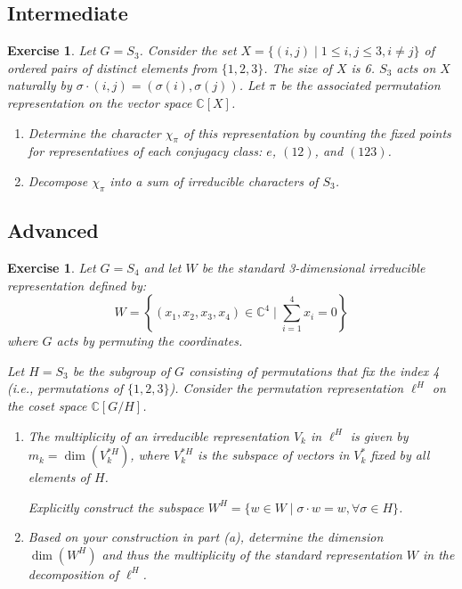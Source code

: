 \documentclass{article}
\newtheorem{exercise}[theorem]{Exercise}
\begin{document}
\subsection*{Intermediate}

\begin{exercise}
Let $G = S_3$. Consider the set $X = \{(i, j) \mid 1 \le i, j \le 3, i \neq j\}$ of ordered pairs of distinct elements from $\{1, 2, 3\}$. The size of $X$ is 6. $S_3$ acts on $X$ naturally by $\sigma \cdot (i, j) = (\sigma(i), \sigma(j))$.
Let $\pi$ be the associated permutation representation on the vector space $\mathbb{C}[X]$.

\begin{enumerate}
    \item[(a)] Determine the character $\chi_\pi$ of this representation by counting the fixed points for representatives of each conjugacy class: $e$, $(12)$, and $(123)$.
    \item[(b)] Decompose $\chi_\pi$ into a sum of irreducible characters of $S_3$.
\end{enumerate}
\end{exercise}

\subsection*{Advanced}

\begin{exercise}
Let $G = S_4$ and let $W$ be the standard 3-dimensional irreducible representation defined by:
\[ W = \left\{ (x_1, x_2, x_3, x_4) \in \mathbb{C}^4 \mid \sum_{i=1}^4 x_i = 0 \right\} \]
where $G$ acts by permuting the coordinates.

Let $H = S_3$ be the subgroup of $G$ consisting of permutations that fix the index 4 (i.e., permutations of $\{1, 2, 3\}$). Consider the permutation representation $\ell^H$ on the coset space $\mathbb{C}[G/H]$.

\begin{enumerate}
    \item[(a)] The multiplicity of an irreducible representation $V_k$ in $\ell^H$ is given by $m_k = \dim(V_k^{*H})$, where $V_k^{*H}$ is the subspace of vectors in $V_k^*$ fixed by all elements of $H$.
    
    Explicitly construct the subspace $W^H = \{ w \in W \mid \sigma \cdot w = w, \forall \sigma \in H \}$.

    \item[(b)] Based on your construction in part (a), determine the dimension $\dim(W^H)$ and thus the multiplicity of the standard representation $W$ in the decomposition of $\ell^H$.
\end{enumerate}
\end{exercise}
\end{document}
